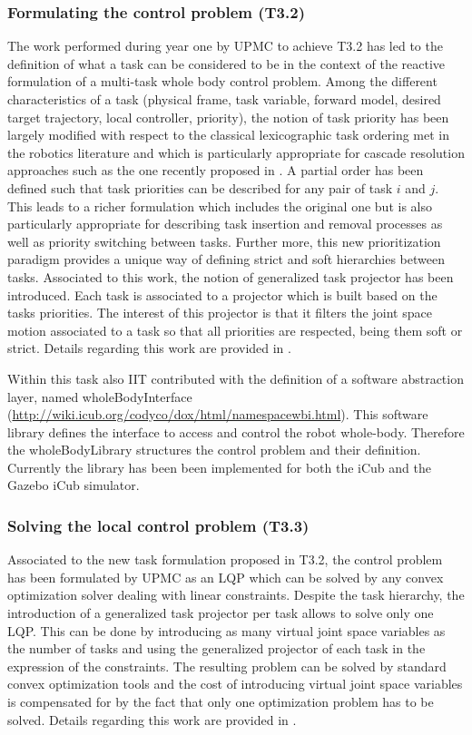 \documentclass[12pt,a4paper,twoside]{article}
\begin{document}
\subsubsection{Formulating the control problem (T3.2)}

The work performed during year one by UPMC to achieve T3.2 has led to the definition of what a task can be considered to be in the context of the reactive formulation of a multi-task whole body control problem. Among the different characteristics of a task (physical frame, task variable, forward model, desired target trajectory, local controller, priority), the notion of task priority has been largely modified with respect to the classical lexicographic task ordering met in the robotics literature and which is particularly appropriate for cascade resolution approaches such as the one recently proposed in \cite{escande2012}. A partial order has been defined such that task priorities can be described for any pair of task $i$ and $j$. This leads to a richer formulation which includes the original one but is also particularly appropriate for describing task insertion and removal processes as well as priority switching between tasks. Further more, this new prioritization paradigm provides a unique way of defining strict and soft hierarchies between tasks. Associated to this work, the notion  of generalized task projector has been introduced. Each task is associated to a projector which is built based on the tasks priorities. The interest of this projector is that it filters the joint space motion associated to a task so that all priorities are respected, being them soft or strict. Details regarding this work are provided in \cite{liu2013}.

Within this task also IIT contributed with the definition of a software abstraction layer, named wholeBodyInterface (\url{http://wiki.icub.org/codyco/dox/html/namespacewbi.html}). This software library defines the interface to access and control the robot  whole-body. Therefore the wholeBodyLibrary structures the control problem and their definition. Currently the library has been been implemented for both the iCub and the Gazebo iCub simulator.  

\subsubsection{Solving the local control problem (T3.3)}

Associated to the new task formulation proposed in T3.2, the control problem has been formulated by UPMC as an LQP which can be solved by any convex optimization solver dealing with linear constraints. Despite the task hierarchy, the introduction of a generalized task projector per task allows to solve only one LQP. This can be done by introducing as many virtual joint space variables as the number of tasks and using the generalized projector of each task in the expression of the constraints. The resulting problem can be solved by standard convex optimization tools and the cost of introducing virtual joint space variables is compensated for by the fact that only one optimization problem has to be solved. Details regarding this work are provided in \cite{liu2013}.
\end{document}
